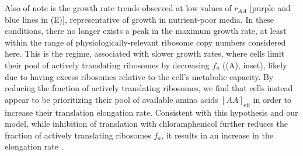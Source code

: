 Also of note is the growth rate trends observed at low values of $r_{AA}$
[purple and blue lines in (E)], representative of
growth in nutrient-poor media. In these conditions, there no longer exists a
peak in the maximum growth rate, at least within the range of
physiologically-relevant ribosome copy numbers considered here. This is the
regime, associated with slower growth rates, where cells limit their pool of
actively translating ribosomes by decreasing $f_a$ ((A),
inset), likely due to having excess ribosomes relative to the cell's metabolic
capacity. By reducing the fraction of actively translating ribosomes, we find
that cells instead appear to be prioritizing their pool of available amino acids
$[AA]_\text{eff}$ in order to increase their translation elongation rate.
Consistent with this hypothesis and our model, while inhibition of translation
with chloramphenicol further reduces the fraction of actively translating
ribosomes $f_a$, it results in an increase in the elongation rate
\citep{dai2016}.
